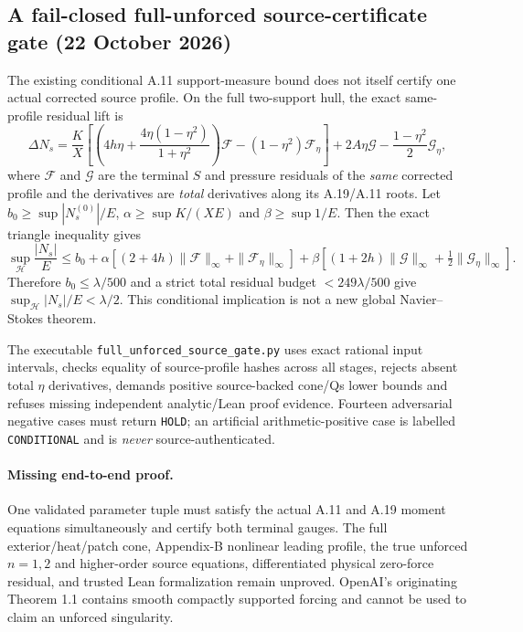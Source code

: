 \subsection*{A fail-closed full-unforced source-certificate gate (22 October 2026)}
\label{subsec:a11-full-unforced-fail-closed}
The existing conditional A.11 support-measure bound does not itself certify one
actual corrected source profile. On the full two-support hull, the exact
same-profile residual lift is
\[
\Delta N_s=\frac KX\left[
\left(4h\eta+\frac{4\eta(1-\eta^2)}{1+\eta^2}\right)\mathcal F
 -(1-\eta^2)\mathcal F_\eta\right]
+2A\eta\mathcal G-\frac{1-\eta^2}{2}\mathcal G_\eta,
\]
where $\mathcal F$ and $\mathcal G$ are the terminal $S$ and pressure
residuals of the \emph{same} corrected profile and the derivatives are
\emph{total} derivatives along its A.19/A.11 roots.
Let $b_0\ge\sup|N_s^{(0)}|/E$, $\alpha\ge\sup K/(XE)$ and
$\beta\ge\sup1/E$. Then the exact triangle inequality gives
\[
\sup_{\mathcal H}\frac{|N_s|}{E}\le b_0+
\alpha[(2+4h)\|\mathcal F\|_\infty+\|\mathcal F_\eta\|_\infty]
+\beta[(1+2h)\|\mathcal G\|_\infty+
                   \tfrac12\|\mathcal G_\eta\|_\infty].
\]
Therefore $b_0\le\lambda/500$ and a strict total residual budget
$<249\lambda/500$ give $\sup_{\mathcal H}|N_s|/E<\lambda/2$.
This conditional implication is not a new global Navier--Stokes theorem.

The executable \texttt{full\_unforced\_source\_gate.py} uses exact rational
input intervals, checks equality of source-profile hashes across all
stages, rejects absent total $\eta$ derivatives, demands positive
source-backed cone/Qs lower bounds and refuses missing independent
analytic/Lean proof evidence. Fourteen adversarial negative cases must
return \texttt{HOLD}; an artificial arithmetic-positive case is labelled
\texttt{CONDITIONAL} and is \emph{never} source-authenticated.

\paragraph{Missing end-to-end proof.}
One validated parameter tuple must satisfy the actual A.11 and A.19
moment equations simultaneously and certify both terminal gauges.
The full exterior/heat/patch cone, Appendix-B nonlinear leading profile,
the true unforced $n=1,2$ and higher-order source equations,
differentiated physical zero-force residual, and trusted Lean
formalization remain unproved. OpenAI's originating Theorem 1.1
contains smooth compactly supported forcing and cannot be used to
claim an unforced singularity.
